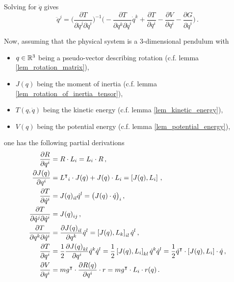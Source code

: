 Solving for $\ddot{q}$ gives
\begin{equation*}
    \ddot{q}^j = \Big( \frac{\partial T}{\partial \dot{q}^j \partial \dot{q}^i} \Big)^{-1} \Big(
    -\frac{\partial T}{\partial q^k \partial \dot{q}^i} \dot{q}^k
    +\frac{\partial T}{\partial q^i}
    -\frac{\partial V}{\partial q^i}
    -\frac{\partial G}{\partial \dot{q}^i} \Big) \,.
\end{equation*}

Now, assuming that the physical system is a 3-dimensional pendulum with
\begin{itemize}
    \item $q \in \mathbb{R}^3$ being a pseudo-vector describing rotation (c.f. lemma \ref{lem_rotation_matrix}),
    \item $J(q)$ being the moment of inertia (c.f. lemma \ref{lem_rotation_of_inertia_tensor}),
    \item $T(q, \dot{q})$ being the kinetic energy (c.f. lemma \ref{lem_kinetic_energy}),
    \item $V(q)$ being the potential energy (c.f. lemma \ref{lem_potential_energy}),
\end{itemize}
one has the following partial derivations
\begin{align*}
    \frac{\partial R}{\partial q^i}
        &= R \cdot L_{i}
         = L_{i} \cdot R \,, \\
    \frac{\partial J(q)}{\partial q^i}
        &= {L^\transpose}_i \cdot J(q) + J(q) \cdot L_i
         = \com{J(q)}{L_i} \,, \\
    \frac{\partial T}{\partial \dot{q}^i}
        &= J(q)\indices{_i_l} \dot{q}^l
         = \big( J(q) \cdot \dot{q} \big)_i \,, \\
    \frac{\partial T}{\partial \dot{q}^j \partial \dot{q}^i}
        &= J(q)\indices{_i_j} \,, \\
    \frac{\partial T}{\partial q^k \partial \dot{q}^i}
        &= \frac{\partial J(q)\indices{_i_l}}{\partial q^k} \dot{q}^l
         = \com{J(q)}{L_k}\indices{_i_l} \dot{q}^l \,, \\
    \frac{\partial T}{\partial q^i}
        &= \frac{1}{2} \frac{\partial J(q)\indices{_k_l}}{\partial q^i} \dot{q}^k \dot{q}^l
         = \frac{1}{2} \com{J(q)}{L_i}\indices{_k_l} \dot{q}^k \dot{q}^l
         = \frac{1}{2} \dot{q}^\transpose \cdot \com{J(q)}{L_i} \cdot \dot{q} \,, \\
    \frac{\partial V}{\partial q^i}
        &= m g^\transpose \cdot \frac{\partial R(q)}{\partial q^i} \cdot r
         = m g^\transpose \cdot L_i \cdot r(q) \,.
\end{align*}

